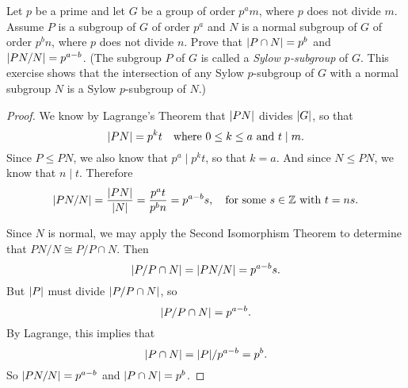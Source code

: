  Let $p$ be a prime and let $G$ be a group of order $p^am$,
where $p$ does not divide $m$. Assume $P$ is a subgroup of $G$ of
order $p^a$ and $N$ is a normal subgroup of $G$ of order $p^bn$, where
$p$ does not divide $n$. Prove that $\lvert{P\cap N}\rvert = p^b$ and
$\lvert{PN/N}\rvert = p^{a-b}$. (The subgroup $P$ of $G$ is called a {\em
  Sylow $p$-subgroup} of $G$. This exercise shows that the
intersection of any Sylow $p$-subgroup of $G$ with a normal subgroup
$N$ is a Sylow $p$-subgroup of $N$.)
\begin{proof}
  We know by Lagrange's Theorem that $\lvert{PN}\rvert$ divides $\lvert{G}\rvert$, so
  that
  \begin{equation*}
    \lvert{PN}\rvert = p^kt
    \quad\text{where $0\leq k\leq a$ and $t\mid m$}.
  \end{equation*}
  Since $P\leq PN$, we also know that $p^a\mid p^kt$, so that $k =
  a$. And since $N\leq PN$, we know that $n\mid t$. Therefore
  \begin{equation*}
    \lvert{PN/N}\rvert
    = \frac{\lvert{PN}\rvert}{\lvert{N}\rvert}
    = \frac{p^at}{p^bn}
    = p^{a-b}s,
    \quad
    \text{for some $s\in\mathbb{Z}$ with $t = ns$}.
  \end{equation*}

  Since $N$ is normal, we may apply the Second Isomorphism Theorem to
  determine that $PN/N\cong P/P\cap N$. Then
  \begin{equation*}
    \lvert{P/P\cap N}\rvert
    = \lvert{PN/N}\rvert
    = p^{a-b}s.
  \end{equation*}
  But $\lvert{P}\rvert$ must divide $\lvert{P/P\cap N}\rvert$, so
  \begin{equation*}
    \lvert{P/P\cap N}\rvert = p^{a-b}.
  \end{equation*}
  By Lagrange, this implies that
  \begin{equation*}
    \lvert{P\cap N}\rvert = \lvert{P}\rvert/p^{a-b} = p^b.
  \end{equation*}
  So $\lvert{PN/N}\rvert = p^{a-b}$ and $\lvert{P\cap N}\rvert = p^b$.
\end{proof}

